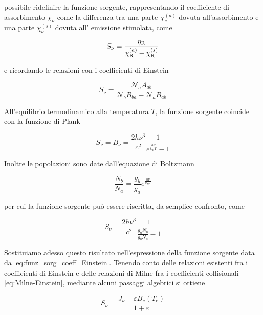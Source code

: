 \vspace{0.2cm}\E possibile ridefinire la funzione sorgente, rappresentando il coefficiente di assorbimento $\chi_\nu$ come la differenza tra una parte $\chi_{\nu}^{(a)}$ dovuta all'assorbimento e una parte $\chi_{\nu}^{(s)}$ dovuta all' emissione stimolata, come

\begin{equation*}
  S_\nu=\frac{\eta_{\rm R}}{\chi_{\rm R}^{(a)} -\chi_{\rm R}^{(s)} }
\end{equation*}

e ricordando le relazioni con i coefficienti di Einstein

\begin{equation*}
  S_\nu=\frac{\mathcal{N}_a A_{ab}}{\mathcal{N}_b B_{ba} - \mathcal{N}_a B_{ab}}
\end{equation*}

All'equilibrio termodinamico alla temperatura $T$, la funzione sorgente coincide con la funzione di Plank

\begin{equation*}
  S_\nu = B_\nu = \frac{2h\nu ^3}{c^2}\frac{1}{e^{\frac{h\nu}{k_B T}}-1}
\end{equation*}

Inoltre le popolazioni sono date dall'equazione di Boltzmann 

\begin{equation*}
  \frac{N_b}{N_a}=\frac{g_b}{g_a}e^{\frac{h\nu}{k_BT}}
\end{equation*}

per cui la funzione sorgente può essere riscritta, da semplice confronto, come

\begin{equation}
  S_\nu = \frac{2h\nu ^3}{c^2}\frac{1}{\frac{g_a N_b}{g_b N_a}-1}
  \label{eq:funz_sorg_coeff_Einstein}
\end{equation}

\hrulefill

Sostituiamo adesso questo risultato nell'espressione della funzione sorgente data da \eqref{eq:funz_sorg_coeff_Einstein}. Tenendo conto delle relazioni esistenti fra i coefficienti di Einstein e delle relazioni di Milne fra i coefficienti collisionali \eqref{eq:Milne-Einstein}, mediante alcuni passaggi algebrici si ottiene

\begin{equation*}
  S_{\nu}=\frac{J_{\nu} + \varepsilon B_{\nu}(T_e)}{1 + \varepsilon}
\end{equation*}

